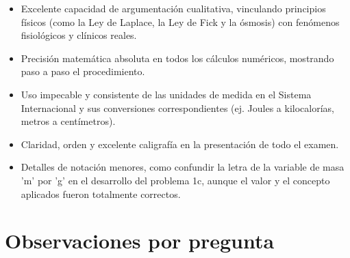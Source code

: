 \documentclass[11pt,a4paper]{article}
\begin{document}
\vspace{4pt}
\begin{minipage}[t]{0.48\linewidth}
  \begin{tcolorbox}[cajaFortaleza, title={Fortalezas}]
\begin{itemize}[leftmargin=1.5em, itemsep=2pt]
  \item Excelente capacidad de argumentación cualitativa, vinculando principios físicos (como la Ley de Laplace, la Ley de Fick y la ósmosis) con fenómenos fisiológicos y clínicos reales.
  \item Precisión matemática absoluta en todos los cálculos numéricos, mostrando paso a paso el procedimiento.
  \item Uso impecable y consistente de las unidades de medida en el Sistema Internacional y sus conversiones correspondientes (ej. Joules a kilocalorías, metros a centímetros).
  \item Claridad, orden y excelente caligrafía en la presentación de todo el examen.
\end{itemize}
  \end{tcolorbox}
\end{minipage}
\hfill
\begin{minipage}[t]{0.48\linewidth}
  \begin{tcolorbox}[cajaMejora, title={Areas de mejora}]
\begin{itemize}[leftmargin=1.5em, itemsep=2pt]
  \item Detalles de notación menores, como confundir la letra de la variable de masa 'm' por 'g' en el desarrollo del problema 1c, aunque el valor y el concepto aplicados fueron totalmente correctos.
\end{itemize}
  \end{tcolorbox}
\end{minipage}

\section*{Observaciones por pregunta}
\end{document}
